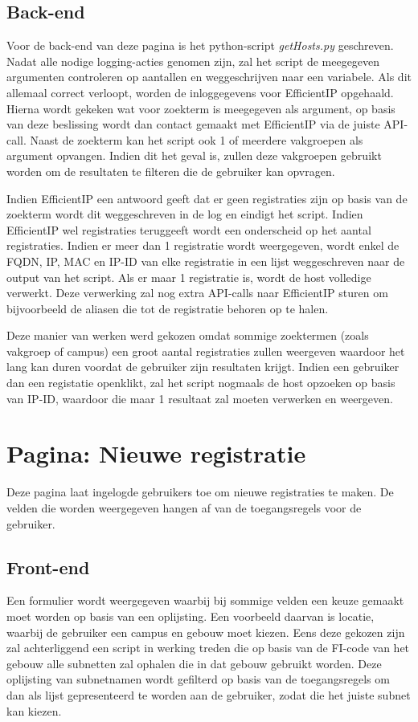 \subsection{Back-end}
Voor de back-end van deze pagina is het python-script \textit{getHosts.py} geschreven. Nadat alle nodige logging-acties genomen zijn, zal het script de meegegeven argumenten controleren  op aantallen en weggeschrijven naar een variabele. Als dit allemaal correct verloopt, worden de inloggegevens voor EfficientIP opgehaald. Hierna wordt gekeken wat voor zoekterm is meegegeven als argument, op basis van deze beslissing wordt dan contact gemaakt met EfficientIP via de juiste API-call. Naast de zoekterm kan het script ook 1 of meerdere vakgroepen als argument opvangen. Indien dit het geval is, zullen deze vakgroepen gebruikt worden om de resultaten te filteren die de gebruiker kan opvragen.

Indien EfficientIP een antwoord geeft dat er geen registraties zijn op basis van de zoekterm wordt dit weggeschreven in de log en eindigt het script. Indien EfficientIP wel registraties teruggeeft wordt een onderscheid op het aantal registraties.
Indien er meer dan 1 registratie wordt weergegeven, wordt enkel de FQDN, IP, MAC en IP-ID van elke registratie in een lijst weggeschreven naar de output van het script. Als er maar 1 registratie is, wordt de host volledige verwerkt. Deze verwerking zal nog extra API-calls naar EfficientIP sturen om bijvoorbeeld de aliasen die tot de registratie behoren op te halen.

Deze manier van werken werd gekozen omdat sommige zoektermen (zoals vakgroep of campus) een groot aantal registraties zullen weergeven waardoor het lang kan duren voordat de gebruiker zijn resultaten krijgt. Indien een gebruiker dan een registatie openklikt, zal het script nogmaals de host opzoeken op basis van IP-ID, waardoor die maar 1 resultaat zal moeten verwerken en weergeven.

\section{Pagina: Nieuwe registratie}
\label{nieuwe-registratie}
Deze pagina laat ingelogde gebruikers toe om nieuwe registraties te maken. De velden die worden weergegeven hangen af van de toegangsregels voor de gebruiker.

\subsection{Front-end}
Een formulier wordt weergegeven waarbij bij sommige velden een keuze gemaakt moet worden op basis van een oplijsting.
Een voorbeeld daarvan is locatie, waarbij de gebruiker een campus en gebouw moet kiezen. Eens deze gekozen zijn zal achterliggend een script in werking treden die op basis van de FI-code van het gebouw alle subnetten zal ophalen die in dat gebouw gebruikt worden.
Deze oplijsting van subnetnamen wordt gefilterd op basis van de toegangsregels om dan als lijst gepresenteerd te worden aan de gebruiker, zodat die het juiste subnet kan kiezen. 


